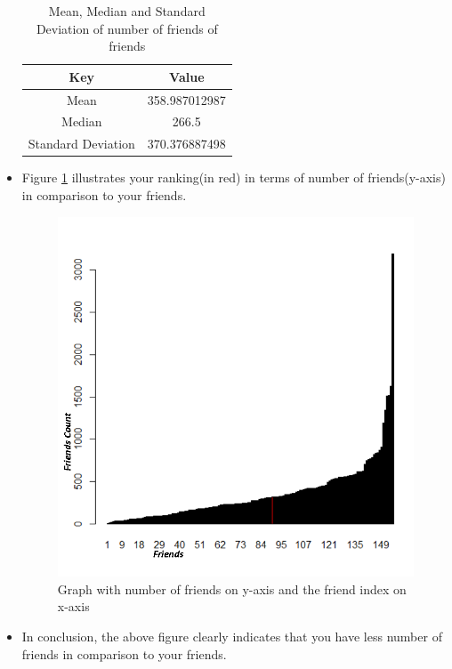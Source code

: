 \begin{itemize}
\begin{table}

\caption{Mean, Median and Standard Deviation of number of friends of friends}
\label{Table:q1table1}
\begin{center}
\begin{tabular}{| c | c |}
\hline
Key & Value \\ \hline

Mean & 358.987012987 \\ \hline
Median & 266.5 \\ \hline
Standard Deviation & 370.376887498 \\ \hline

\hline

\end{tabular}
\end{center}
\end{table}

\newpage
\item Figure \ref{fig:q1fig3} illustrates your ranking(in red) in terms of number of friends(y-axis) in comparison to your friends.
\begin{figure}[h!]
\begin{center}
\includegraphics[scale=0.55, keepaspectratio=true]{figures/q1final.PNG}
\caption{Graph with number of friends on y-axis and the friend index on x-axis }
\label{fig:q1fig3}
\end{center}
\end{figure}
\item In conclusion, the above figure clearly indicates that you have less number of friends in comparison to your friends.
\end{itemize}

